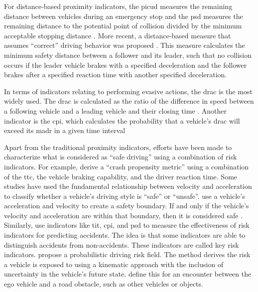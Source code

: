 For distance-based proximity indicators, the \ac{picud} measures the remaining distance between vehicles during an emergency stop \autocite{iida2001traffic, uno2003objective} and the \ac{psd} measures the remaining distance to the potential point of collision divided by the minimum acceptable stopping distance \autocite{allen1978analysis, guido2011comparing, mahmud2017application}. 
More recent, a distance-based measure that assumes ``correct'' driving behavior was proposed \autocite{shalev2017formal}. 
This measure calculates the minimum safety distance between a follower and its leader, such that no collision occurs if the leader vehicle brakes with a specified deceleration and the follower brakes after a specified reaction time with another specified deceleration. 

In terms of indicators relating to performing evasive actions, the \ac{drac} is the most widely used. 
The \ac{drac} is calculated as the ratio of the difference in speed between a following vehicle and a leading vehicle and their closing time \autocite{almqvist1991use, mahmud2017application}. 
Another indicator is the \ac{cpi}, which calculates the probability that a vehicle's \ac{drac} will exceed its \ac{madr} in a given time interval \autocite{cunto2009simulated} 


Apart from the traditional proximity indicators, efforts have been made to characterize what is considered as ``safe driving'' using a combination of risk indicators.
For example, \textcite{wang2014evaluation} derive a ``crash propensity metric'' using a combination of the \ac{ttc}, the vehicle braking capability, and the driver reaction time.
Some studies have used the fundamental relationship between velocity and acceleration to classify whether a vehicle's driving style  is ``safe'' or ``unsafe''. 
\textcite{eboli2016combining} use a vehicle's acceleration and velocity to create a safety boundary.
If and only if the vehicle's velocity and acceleration are within that boundary, then it is considered safe \autocite{eboli2016combining}.
Similarly, \textcite{shi2018key} use indicators like \ac{tit}, \ac{cpi}, and \ac{psd} to measure the effectiveness of risk indicators for predicting accidents. 
The idea is that some indicators are able to distinguish accidents from non-accidents. 
These indicators are called key risk indicators. 
\textcite{mullakkal2020probabilistic} propose a probabilistic driving risk field.
The method derives the risk a vehicle is exposed to using a kinematic approach with the inclusion of uncertainty in the vehicle's future state. 
\textcite{mullakkal2020probabilistic} define this for an encounter between the ego vehicle and a road obstacle, such as other vehicles or objects. 

